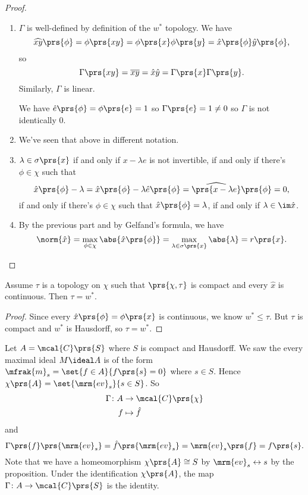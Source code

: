 \documentclass[10pt, twoside]{book}
\begin{document}
\begin{proof}
\begin{enumerate}
\item $\Gamma$ is well-defined by definition of the $w^*$ topology. We have
\[\widehat{xy}\prs{\phi} = \phi\prs{xy} = \phi\prs{x} \phi\prs{y} = \hat{x}\prs{\phi} \hat{y} \prs{\phi} \text{,}\]
so
\[\Gamma\prs{xy} = \overline{xy} = \hat{x} \hat{y} = \Gamma\prs{x} \Gamma\prs{y} \text{.}\]
Similarly, $\Gamma$ is linear.

We have $\hat{e}\prs{\phi} = \phi\prs{e} = 1$ so $\Gamma\prs{e} = 1 \neq 0$ so $\Gamma$ is not identically $0$.

\item We've seen that above in different notation.

\item $\lambda \in \sigma\prs{x}$ if and only if $x - \lambda e$ is not invertible, if and only if there's $\phi \in \chi$ such that \[\hat{x}\prs{\phi} - \lambda = \hat{x} \prs{\phi} - \lambda \hat{e}\prs{\phi} = \widehat{\prs{x-\lambda e}}\prs{\phi} = 0 \text{,}\]
if and only if there's $\phi \in \chi$ such that $\hat{x}\prs{\phi} = \lambda$,
if and only if $\lambda \in \im \hat{x}$.

\item By the previous part and by Gelfand's formula, we have
\[\norm{\hat{x}} = \max_{\phi \in \chi} \abs{\hat{x}\prs{\phi}} = \max_{\lambda \in \sigma\prs{x}} \abs{\lambda} = r\prs{x} \text{.}\]
\end{enumerate}
\end{proof}

\begin{proposition}
Assume $\tau$ is a topology on $\chi$ such that $\prs{\chi, \tau}$ is compact and every $\hat{x}$ is continuous. Then $\tau = w^*$.
\end{proposition}

\begin{proof}
Since every $\hat{x} \prs{\phi} = \phi\prs{x}$ is continuous, we know $w^* \leq \tau$.
But $\tau$ is compact and $w^*$ is Hausdorff, so $\tau = w^*$.
\end{proof}

\begin{example}
Let $A = \mcal{C}\prs{S}$ where $S$ is compact and Hausdorff.
We saw the every maximal ideal $M \ideal A$ is of the form $\mfrak{m}_s = \set{f \in A}{f\prs{s} = 0}$ where $s \in S$.
Hence $\chi\prs{A} = \set{\mrm{ev}_s}{s \in S}$.
So
\begin{align*}
\Gamma \colon A &\to \mcal{C}\prs{\chi} \\
f &\mapsto \hat{f}
\end{align*}
and
\[\Gamma\prs{f}\prs{\mrm{ev}_s} = \hat{f}\prs{\mrm{ev}_s} = \mrm{ev}_s\prs{f} = f\prs{s} \text{.}\]
Note that we have a homeomorphism $\chi\prs{A} \cong S$ by $\mrm{ev}_s \leftrightarrow s$ by the proposition. Under the identification $\chi\prs{A}$, the map $\Gamma \colon A \to \mcal{C}\prs{S}$ is the identity.
\end{example}
\end{document}
